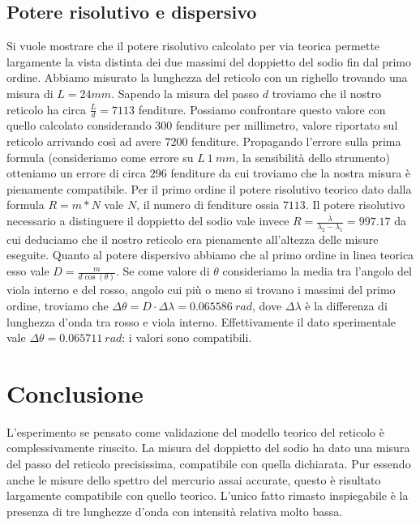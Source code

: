 \documentclass[a4paper,10pt]{article}
\begin{document}
	\subsection{Potere risolutivo e dispersivo}
	Si vuole mostrare che il potere risolutivo calcolato per via teorica permette largamente la vista distinta dei due massimi del doppietto del sodio fin dal primo ordine. Abbiamo misurato la lunghezza del reticolo con un righello trovando una misura di $L = 24 mm$. Sapendo la misura del passo $d$ troviamo che il nostro reticolo ha circa $\frac{L}{d} = 7113$ fenditure. Possiamo confrontare questo valore con quello calcolato considerando 300 fenditure per millimetro, valore riportato sul reticolo arrivando così ad avere $7200$ fenditure. Propagando l'errore sulla prima formula (consideriamo come errore su $L \ 1 \ mm$, la sensibilità dello strumento) otteniamo un errore di circa $296$ fenditure da cui troviamo che la nostra misura è pienamente compatibile. Per il primo ordine il potere risolutivo teorico dato dalla formula $R = m*N$ vale $N$, il numero di fenditure ossia $7113$. Il potere risolutivo necessario a distinguere il doppietto del sodio vale invece $R = \frac{\overline{\lambda}}{\lambda _2 - \lambda _1} = 997.17$ da cui deduciamo che il nostro reticolo era pienamente all'altezza delle misure eseguite. Quanto al potere dispersivo abbiamo che al primo ordine in linea teorica esso vale $D = \frac{m}{d \cos(\theta)}$. Se come valore di $\theta$ consideriamo la media tra l'angolo del viola interno e del rosso, angolo cui più o meno si trovano i massimi del primo ordine, troviamo che $\Delta \theta = D \cdot \Delta \lambda = 0.065586 \ rad$, dove $\Delta \lambda$ è la differenza di lunghezza d'onda tra rosso e viola interno. Effettivamente il dato sperimentale vale $\Delta \theta = 0.065711 \ rad$: i valori sono compatibili.
	
	\section{Conclusione}
	L'esperimento se pensato come validazione del modello teorico del reticolo è complessivamente riuscito. La misura del doppietto del sodio ha dato una misura del passo del reticolo precisissima, compatibile con quella dichiarata. Pur essendo anche le misure dello spettro del mercurio assai accurate, questo è risultato largamente compatibile con quello teorico. L'unico fatto rimasto inspiegabile è la presenza di tre lunghezze d'onda con intensità relativa molto bassa.
\end{document}
